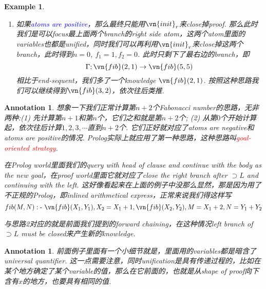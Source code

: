 \documentclass{article}
\theoremstyle{plain}
\newtheorem{example}[theorem]{Example}
\newtheorem{annotation}[theorem]{Annotation}
\theoremstyle{nonumberplain}
\newcommand{\redt}[1]{\textcolor{red}{#1}}
\newcommand{\bluet}[1]{\textcolor{blue}{#1}}
\begin{document}
\begin{example}
\begin{itemize}
\begin{enumerate}
\[		\]
		它们和我们end-sequent是非常像的，我们可以用前面的步骤分别在对它们再做一次derivation，对于$\vn{fib}(4,x)$，利用iter-con显然我们可以得到
		\[
			\Gamma;\cdot \to \vn{fib}(3,y)~\text{and}~\Gamma;\cdot \to \vn{fib}(2,x-y)	
		\]
		对于$\vn{fib}(3, 5-x)$同理有
		\[
			\Gamma;\cdot \to \vn{fib}(2,z)~\text{and}~\Gamma;\cdot \to \bluet{\vn{fib}(1, 5-x-z)}
		\]
		可以看到直到$\vn{fib}(1,0)$或者$\vn{fib}(0,0)$才会停止. 这背后本质就是如果我要计算第5个Fabonacci number, 那么我得先计算第4个Fabonacci number和第3个Fabonacci number.
		\item 如果\bluet{atoms are positive}，那么最终只能用$\vn{init}_r$来close掉proof. 那么此时我们是可以focus最上面两个branch的right side atom，这两个atom里面的variables也都是unified，同时我们可以再利用$\vn{init}_r$来close掉这两个branch，此时得到$n = 0$, $f_1 = 1, f_2 = 0$. 此时只剩下了最右边的branch，即
		\[
			\Gamma;\vn{fib}(2,1) \to \vn{fib}(5,5) 
		\]
		相比于end-sequent，我们多了一个knowledge $\vn{fib}(2,1)$. 按照这种思路我们可以继续得到$\vn{fib}(3,2)$，依次往后类推.
	\end{enumerate}
\end{itemize}
\end{example}


\begin{annotation}
\rm 想象一下我们正常计算第$n+2$个Fabonacci number的思路，无非两种:(1) 先计算第$n+1$和第$n$个，它们之和就是第$n+2$个; (2) 从第$0$个开始计算起，依次往后计算$1,2,3,\cdots$直到$n+2$个. 它们正好就对应了atoms are negative和atoms are positive的情况. Prolog实际上就应用了第一种思路，这种思路叫\redt{goal-oriented strategy}. 

在Prolog world里面我们的query with head of clause and continue with the body as the new goal，在proof world里面它就对应了close the right branch after $\supset L$ and continuing with the left. 这好像看起来在上面的例子中没那么显然，那是因为用了不正规的Prolog，即inlined arithmetical express，正常来说我们得这样写
$$
fib(M,N) :\text{-}~ \vn{fib}(X_1, Y_1), X_2 = X_1 + 1, \vn{fib}(X_2, Y_2), M =X_1 + 2, N = Y_1 + Y_2 
$$

与思路2对应的就是前面我们提到的forward chaining，在这种情况left branch of $\supset L$ must be closed来产生新的knowledge. 
\end{annotation}

\begin{annotation}
\rm 前面例子里面有一个小细节就是，里面用的variables都是暗含了universal quantifier. 这一点需要注意，同时unification是具有传递过程的，比如在某个地方确定了某个variable的值，那么在它前面的，也就是从shape of proof向下含有$x$的地方，也要具有相同的值.
\end{annotation}
\end{document}
